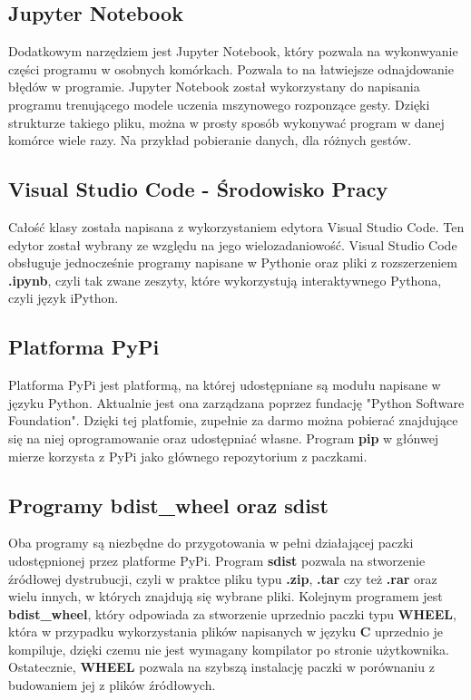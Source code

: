 \subsection{Jupyter Notebook}
\quad Dodatkowym narzędziem jest Jupyter Notebook, który pozwala na wykonwyanie części programu w osobnych komórkach. Pozwala to na łatwiejsze odnajdowanie błędów w programie.
\quad Jupyter Notebook został wykorzystany do napisania programu trenującego modele uczenia mszynowego rozponzące gesty. Dzięki strukturze takiego pliku, można w prosty sposób wykonywać program w danej komórce wiele razy. Na przykład pobieranie danych, dla różnych gestów. 

\subsection{Visual Studio Code - Środowisko Pracy}
\quad Całość klasy została napisana z wykorzystaniem edytora Visual Studio Code. Ten edytor został wybrany ze względu na jego wielozadaniowość. Visual Studio Code obsługuje jednocześnie programy napisane w Pythonie oraz pliki z rozszerzeniem \textbf{.ipynb}, czyli tak zwane zeszyty, które wykorzystują interaktywnego Pythona, czyli język iPython. 

\subsection{Platforma PyPi}
\quad Platforma PyPi jest platformą, na której udostępniane są modułu napisane w języku Python. Aktualnie jest ona zarządzana poprzez fundację "Python Software Foundation". Dzięki tej platfomie, zupełnie za darmo można pobierać znajdujące się na niej oprogramowanie oraz udostępniać własne. Program \textbf{pip} w głónwej mierze korzysta z PyPi jako głównego repozytorium z paczkami. 

\subsection{Programy bdist\_wheel oraz sdist}
\quad Oba programy są niezbędne do przygotowania w pełni działającej paczki udostępnionej przez platforme PyPi. Program \textbf{sdist} pozwala na stworzenie źródłowej dystrubucji, czyli w praktce pliku typu \textbf{.zip}, \textbf{.tar} czy też \textbf{.rar} oraz wielu innych, w których znajdują się wybrane pliki. 
\quad Kolejnym programem jest \textbf{bdist\_wheel}, który odpowiada za stworzenie uprzednio paczki typu \textbf{WHEEL}, która w przypadku wykorzystania plików napisanych w języku \textbf{C} uprzednio je kompiluje, dzięki czemu nie jest wymagany kompilator po stronie użytkownika. Ostatecznie, \textbf{WHEEL} pozwala na szybszą instalację paczki w porównaniu z budowaniem jej z plików źródłowych. 


